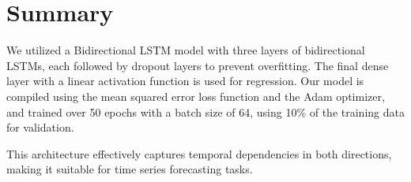 \section*{Summary}

We utilized a Bidirectional LSTM model with three layers of bidirectional LSTMs, each followed by dropout layers to prevent overfitting. The final dense layer with a linear activation function is used for regression. Our model is compiled using the mean squared error loss function and the Adam optimizer, and trained over 50 epochs with a batch size of 64, using 10\% of the training data for validation.

This architecture effectively captures temporal dependencies in both directions, making it suitable for time series forecasting tasks.
